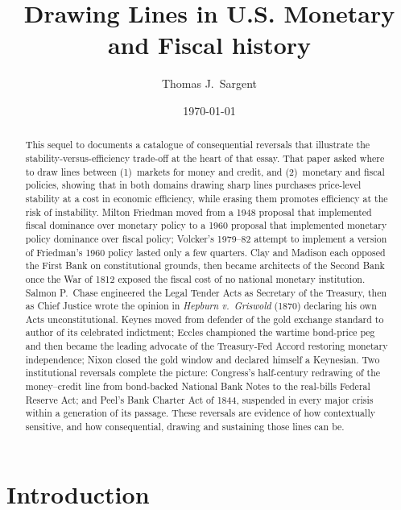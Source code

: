 \documentclass[12pt]{article}
\title{Drawing Lines in U.S. Monetary and Fiscal history}
\author{Thomas J.~Sargent}
\date{\today}
\begin{document}
\maketitle

\begin{abstract}
This sequel to \citet{Sargent2011} documents a catalogue of consequential
reversals that illustrate the stability-versus-efficiency trade-off
at the heart of that essay.  That paper asked where to draw
lines between (1)~markets for money and credit, and (2)~monetary and
fiscal policies, showing that in both domains drawing sharp lines
purchases price-level stability at a cost in economic efficiency, while
erasing them promotes efficiency at the risk of instability.  Milton
Friedman moved from a 1948 proposal that implemented fiscal dominance over monetary policy to a 1960 proposal that implemented monetary policy dominance over fiscal policy; Volcker's 1979--82 attempt
to implement a version of Friedman's 1960 policy lasted only a few quarters.  Clay and
Madison each opposed the First Bank on constitutional grounds, then
became architects of the Second Bank once the War of 1812 exposed the
fiscal cost of no national monetary institution.  Salmon P.\ Chase
engineered the Legal Tender Acts as Secretary of the Treasury, then as
Chief Justice wrote the opinion in \textit{Hepburn v.\ Griswold} (1870)
declaring his own Acts unconstitutional.  Keynes moved from defender of the gold
exchange standard to author of its celebrated indictment; Eccles
championed the wartime bond-price peg and then became the leading
advocate of the Treasury-Fed Accord restoring monetary independence;
Nixon closed the gold window and declared himself a Keynesian.  Two
institutional reversals complete the picture: Congress's half-century
redrawing of the money--credit line from bond-backed National Bank Notes
to the real-bills Federal Reserve Act; and Peel's Bank Charter Act of
1844, suspended in every major crisis within a generation of its
passage.  These reversals are evidence of how contextually sensitive,
and how consequential, drawing and sustaining those lines can be.
\end{abstract}
%
%
\section{Introduction}
\end{document}
